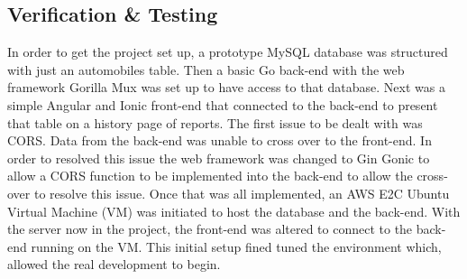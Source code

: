\subsection{Verification \& Testing}
In order to get the project set up, a prototype MySQL database was structured with just an automobiles table. Then a basic Go back-end with the web framework Gorilla Mux was set up to have access to that database. Next was a simple Angular and Ionic front-end that connected to the back-end to present that table on a history page of reports. The first issue to be dealt with was CORS. Data from the back-end was unable to cross over to the front-end. In order to resolved this issue the web framework was changed to Gin Gonic to allow a CORS function to be implemented into the back-end to allow the cross-over to resolve this issue. Once that was all implemented, an AWS E2C Ubuntu Virtual Machine (VM) was initiated to host the database and the back-end. With the server now in the project, the front-end was altered to connect to the back-end running on the VM. This initial setup fined tuned the environment which, allowed the real development to begin. 


